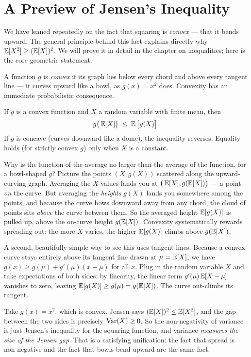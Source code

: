 \section{A Preview of Jensen's Inequality}
\label{ch09:jensen}

We have leaned repeatedly on the fact that squaring is \emph{convex} --- that
it bends upward. The general principle behind this fact explains directly
why $\operatorname{\mathbb{E}}[X^2] \ge (\operatorname{\mathbb{E}}[X])^2$. We will prove it in detail in the chapter on
inequalities; here is the core geometric statement.

A function $g$ is \emph{convex} if its graph lies below every chord and above
every tangent line --- it curves upward like a bowl, as $g(x) = x^2$ does.
Convexity has an immediate probabilistic consequence.

\begin{theorem}
\label{ch09:thm-jensen}
If $g$ is a convex function and $X$ a random variable with finite mean, then
\[
  g\big(\operatorname{\mathbb{E}}[X]\big) \;\le\; \operatorname{\mathbb{E}}\big[g(X)\big].
\]
If $g$ is concave (curves downward like a dome), the inequality reverses. Equality holds (for strictly
convex $g$) only when $X$ is a constant.
\end{theorem}

\begin{whybox}
Why is the function of the average no larger than the average of the function,
for a bowl-shaped $g$? Picture the points $(X, g(X))$ scattered along the
upward-curving graph. Averaging the $X$-values lands you at
$\big(\operatorname{\mathbb{E}}[X], g(\operatorname{\mathbb{E}}[X])\big)$ --- a point \emph{on} the curve. But averaging the
\emph{heights} $g(X)$ lands you somewhere among the points, and because the
curve bows downward away from any chord, the cloud of points sits \emph{above}
the curve between them. So the averaged height $\operatorname{\mathbb{E}}[g(X)]$ is pulled up, above
the on-curve height $g(\operatorname{\mathbb{E}}[X])$. Convexity systematically rewards spreading
out: the more $X$ varies, the higher $\operatorname{\mathbb{E}}[g(X)]$ climbs above $g(\operatorname{\mathbb{E}}[X])$.

A second, beautifully simple way to see this uses tangent lines. Because a convex
curve stays entirely above its tangent line drawn at $\mu = \operatorname{\mathbb{E}}[X]$, we have
$g(x) \ge g(\mu) + g'(\mu)(x-\mu)$ for all $x$. Plug in the random variable $X$
and take expectations of both sides: by linearity, the linear term
$g'(\mu)\operatorname{\mathbb{E}}[X-\mu]$ vanishes to zero, leaving $\operatorname{\mathbb{E}}[g(X)] \ge g(\mu) = g(\operatorname{\mathbb{E}}[X])$.
The curve out-climbs its tangent.
\end{whybox}

Take $g(x) = x^2$, which is convex. Jensen says
$(\operatorname{\mathbb{E}}[X])^2 \le \operatorname{\mathbb{E}}[X^2]$, and the gap between the two sides is precisely
$\operatorname{Var}(X) \ge 0$. So the non-negativity of variance is just Jensen's
inequality for the squaring function, and variance \emph{measures the size of
the Jensen gap}. That is a satisfying unification: the fact that spread is
non-negative and the fact that bowls bend upward are the same fact.

